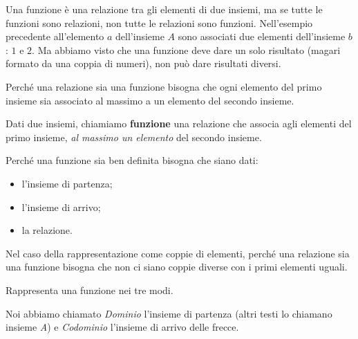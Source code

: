 \vspace{.5em}
Una funzione è una relazione tra gli elementi di due insiemi, ma se 
tutte le funzioni sono relazioni, non tutte le relazioni sono funzioni.
Nell'esempio precedente all'elemento \(a\) dell'insieme \(A\) sono associati
due elementi dell'insieme \(b\): \(1\) e \(2\).
Ma abbiamo visto che una funzione deve dare un solo risultato (magari formato 
da una coppia di numeri), non può dare risultati diversi.

Perché una relazione sia una funzione bisogna che ogni elemento del primo 
insieme sia associato al massimo a un elemento del secondo insieme.

\begin{definizione}
Dati due insiemi, chiamiamo \textbf{funzione} una relazione che associa agli 
elementi del primo insieme, \emph{al massimo un elemento} del secondo insieme.
\end{definizione}

Perché una funzione sia ben definita bisogna che siano dati:
\begin{itemize} [nosep]
\item l'insieme di partenza;
\item l'insieme di arrivo;
\item la relazione.
\end{itemize}

Nel caso della rappresentazione come coppie di elementi, perché una relazione 
sia una funzione bisogna che non ci siano coppie diverse con i primi elementi 
uguali.

\pagebreak %

\begin{esempio}
Rappresenta una funzione nei tre modi.\\

\end{esempio}

Noi abbiamo chiamato \emph{Dominio} l'insieme di partenza 
(altri testi lo chiamano insieme \emph{A})
e \emph{Codominio} l'insieme di arrivo delle frecce.

